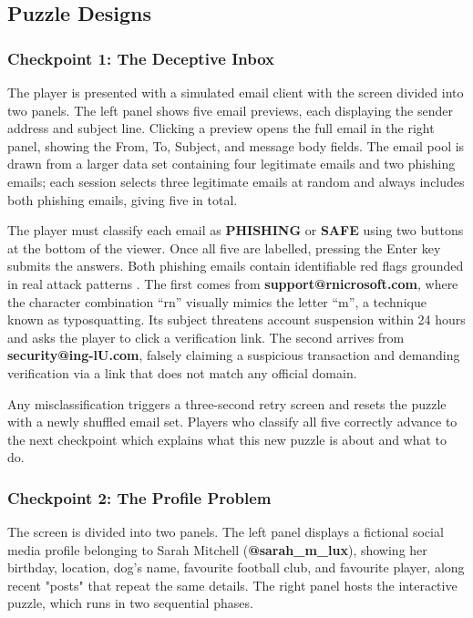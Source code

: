 \documentclass[sigconf, authorversion=true, nonacm=true]{acmart}%
\begin{document}
\subsection{Puzzle Designs}

\subsubsection{Checkpoint 1: The Deceptive Inbox}

The player is presented with a simulated email client with the screen divided into two panels. The left panel shows five email previews, each displaying the sender address and subject line. Clicking a preview opens the full email in the right panel, showing the From, To, Subject, and message body fields. The email pool is drawn from a larger data set containing four legitimate emails and two phishing emails; each session selects three legitimate emails at random and always includes both phishing emails, giving five in total.

The player must classify each email as \textbf{PHISHING} or \textbf{SAFE} using two buttons at the bottom of the viewer. Once all five are labelled, pressing the Enter key submits the answers. Both phishing emails contain identifiable red flags grounded in real attack patterns \cite{enisa_phishing_2020}. The first comes from \textbf{support@rnicrosoft.com}, where the character combination ``rn'' visually mimics the letter ``m'', a technique known as typosquatting. Its subject threatens account suspension within 24 hours and asks the player to click a verification link. The second arrives from \textbf{security@ing-lU.com}, falsely claiming a suspicious transaction and demanding verification via a link that does not match any official domain.

Any misclassification triggers a three-second retry screen and resets the puzzle with a newly shuffled email set. Players who classify all five correctly advance to the next checkpoint which explains what this new puzzle is about and what to do. 


\subsubsection{Checkpoint 2: The Profile Problem}

The screen is divided into two panels. The left panel displays a fictional social media profile belonging to Sarah Mitchell (\textbf{@sarah\_m\_lux}), showing her birthday, location, dog's name, favourite football club, and favourite player, along recent "posts" that repeat the same details. The right panel hosts the interactive puzzle, which runs in two sequential phases.
\end{document}
